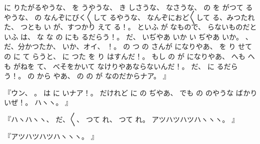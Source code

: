 に
りたがるやうな、
を
うやうな、
き
しさうな、
なさうな、
の
を
がつて
るやうな、
の
なんぞにびく〳〵して
るやうな、
なんぞにおど〳〵して
る、みつたれた、
つとも
い
が、すつかり
えて
る！。
といふ
が
なもので、
らないものだといふ
は、
な
な
の
にも
るだらう！。
だ、
いぢやあ
いか
い
ぢやあ
いか。
、
だ、分かつたか、
いか、オイ、
！。
の
つ
の
さんが
になりやあ、
を
り
せて
の
に
て
らうと、
に
つた
を
り
はすんだ！。
もし
の
が
になりやあ、
へも
へも
がねを
て、
べそをかいて
なけりやあならないんだ！。
だ、
に
るだらう！。
の
から
やあ、
の
の
が
なのだからナア。
』

『ウン、
。
は
に
いナア！。
だけれど
に
の
ぢやあ、
でも
の
のやうな
ばかり
いぜ！。
ハヽヽ。
』

『ハヽハヽヽ、
だ、〳〵、
つて
れ、
つて
れ。
アツハツハツハヽヽヽ。
』

『アツハツハツハヽヽヽ。
』

